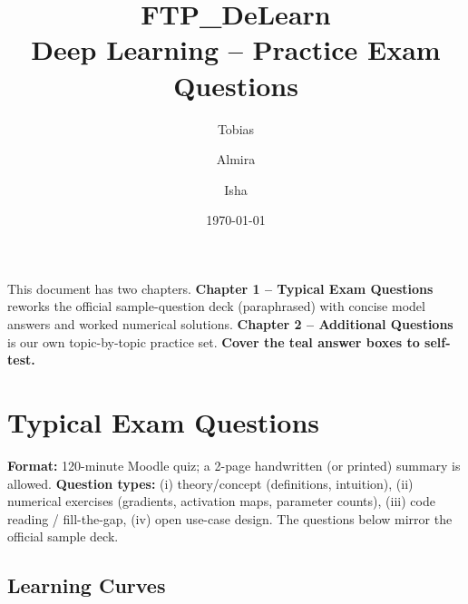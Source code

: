 \documentclass[10pt,a4paper]{article}
\title{\textbf{FTP\_DeLearn}\\Deep Learning -- Practice Exam Questions}
\author{Tobias \and Almira \and Isha}
\date{\today}
\begin{document}
\maketitle

\begin{importantbox}
This document has two chapters. \textbf{Chapter 1 -- Typical Exam Questions} reworks the official sample-question deck (paraphrased) with concise model answers and worked numerical solutions. \textbf{Chapter 2 -- Additional Questions} is our own topic-by-topic practice set. \textbf{Cover the teal answer boxes to self-test.}
\end{importantbox}

\tableofcontents
\newpage

\section{Typical Exam Questions}

\begin{importantbox}
\textbf{Format:} 120-minute Moodle quiz; a 2-page handwritten (or printed) summary is allowed. \textbf{Question types:} (i) theory/concept (definitions, intuition), (ii) numerical exercises (gradients, activation maps, parameter counts), (iii) code reading / fill-the-gap, (iv) open use-case design. The questions below mirror the official sample deck.
\end{importantbox}

\subsection{Learning Curves}
\end{document}

